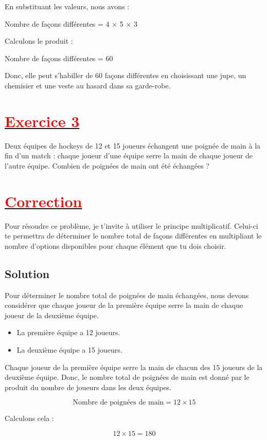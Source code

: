 \documentclass[12pt]{article}
\begin{document}
En substituant les valeurs, nous avons :

Nombre de façons différentes = 4 × 5 × 3

Calculons le produit :

Nombre de façons différentes = 60

Donc, elle peut s'habiller de 60 façons différentes en choisissant une jupe, un chemisier et une veste au hasard dans sa garde-robe.
\section*{\underline{\textbf{\textcolor{red}{Exercice 3}}}}
Deux équipes de hockeys de 12 et 15 joueurs échangent une poignée de main à la fin d’un match : chaque joueur d’une équipe serre la main de chaque joueur de l’autre équipe. Combien de poignées de main ont été échangées ?
\section*{\underline{\textbf{\textcolor{red}{Correction}}}}
Pour résoudre ce problème, je t'invite à utiliser le principe multiplicatif. Celui-ci te permettra de déterminer le nombre total de façons différentes en multipliant le nombre d'options disponibles pour chaque élément que tu dois choisir.

\subsection*{Solution}

Pour déterminer le nombre total de poignées de main échangées, nous devons considérer que chaque joueur de la première équipe serre la main de chaque joueur de la deuxième équipe. 

\begin{itemize}
    \item La première équipe a 12 joueurs.
    \item La deuxième équipe a 15 joueurs.
\end{itemize}

Chaque joueur de la première équipe serre la main de chacun des 15 joueurs de la deuxième équipe. Donc, le nombre total de poignées de main est donné par le produit du nombre de joueurs dans les deux équipes.

\[
\text{Nombre de poignées de main} = 12 \times 15
\]

Calculons cela :

\[
12 \times 15 = 180
\]
\end{document}
